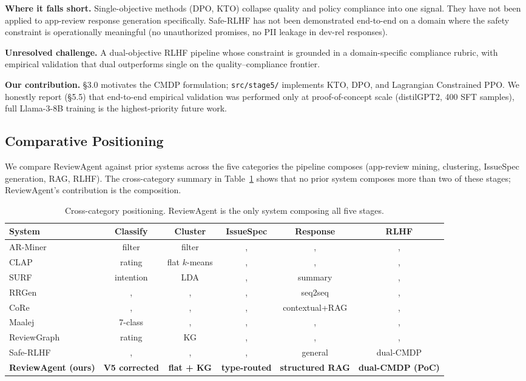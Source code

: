 \documentclass[sigconf, nonacm, anonymous, balance=false]{acmart}
\begin{document}
\textbf{Where it falls short.} Single-objective methods (DPO, KTO) collapse quality and policy compliance into one signal. They have not been applied to app-review response generation specifically. Safe-RLHF has not been demonstrated end-to-end on a domain where the safety constraint is operationally meaningful (no unauthorized promises, no PII leakage in dev-rel responses).

\textbf{Unresolved challenge.} A dual-objective RLHF pipeline whose constraint is grounded in a domain-specific compliance rubric, with empirical validation that dual outperforms single on the quality--compliance frontier.

\textbf{Our contribution.} \S3.0 motivates the CMDP formulation; \texttt{src/stage5/} implements KTO, DPO, and Lagrangian Constrained PPO. We honestly report (\S5.5) that end-to-end empirical validation was performed only at proof-of-concept scale (distilGPT2, 400 SFT samples), full Llama-3-8B training is the highest-priority future work.

\subsection{Comparative Positioning}\label{comparative-positioning}

We compare ReviewAgent against prior systems across the five categories the pipeline composes (app-review mining, clustering, IssueSpec generation, RAG, RLHF). The cross-category summary in Table~\ref{tab:cross-category} shows that no prior system composes more than two of these stages; ReviewAgent's contribution is the composition.

\begin{table}[t]
\centering
\footnotesize
\setlength{\tabcolsep}{4pt}
\caption{Cross-category positioning. ReviewAgent is the only system composing all five stages.}
\label{tab:cross-category}
\begin{tabular}{lccccc}
\toprule
System & Classify & Cluster & IssueSpec & Response & RLHF \\
\midrule
AR-Miner \cite{chen2014arminer} & filter & filter &, &, &, \\
CLAP \cite{villarroel2016} & rating & flat $k$-means &, &, &, \\
SURF \cite{disorbo2016surf} & intention & LDA &, & summary &, \\
RRGen \cite{gao2019rrgen} &, &, &, & seq2seq &, \\
CoRe \cite{gao2020core} &, &, &, & contextual+RAG &, \\
Maalej \cite{maalej2016} & 7-class &, &, &, &, \\
ReviewGraph \cite{xu2025reviewgraph} & rating & KG &, &, &, \\
Safe-RLHF \cite{dai2023} &, &, &, & general & dual-CMDP \\
\textbf{ReviewAgent (ours)} & \textbf{V5 corrected} & \textbf{flat + KG} & \textbf{type-routed} & \textbf{structured RAG} & \textbf{dual-CMDP (PoC)} \\
\bottomrule
\end{tabular}
\end{table}
\end{document}
